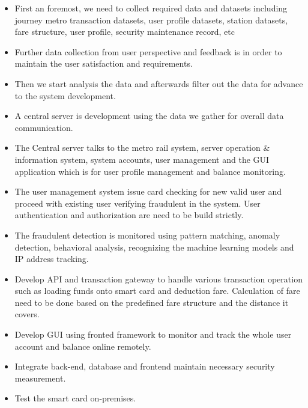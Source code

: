 \begin{itemize}
\tightlist
\item
  First an foremost, we need to collect required data and datasets
  including journey metro transaction datasets, user profile datasets,
  station datasets, fare structure, user profile, security maintenance
  record, etc
\item
  Further data collection from user perspective and feedback is in order
  to maintain the user satisfaction and requirements.
\item
  Then we start analysis the data and afterwards filter out the data for
  advance to the system development.
\item
  A central server is development using the data we gather for overall
  data communication.
\item
  The Central server talks to the metro rail system, server operation \&
  information system, system accounts, user management and the GUI
  application which is for user profile management and balance
  monitoring.
\item
  The user management system issue card checking for new valid user and
  proceed with existing user verifying fraudulent in the system. User
  authentication and authorization are need to be build strictly.
\item
  The fraudulent detection is monitored using pattern matching, anomaly
  detection, behavioral analysis, recognizing the machine learning
  models and IP address tracking.
\item
  Develop API and transaction gateway to handle various transaction
  operation such as loading funds onto smart card and deduction fare.
  Calculation of fare need to be done based on the predefined fare
  structure and the distance it covers.
\item
  Develop GUI using fronted framework to monitor and track the whole
  user account and balance online remotely.
\item
  Integrate back-end, database and frontend maintain necessary security
  measurement.
\item
  Test the smart card on-premises.
\end{itemize}
